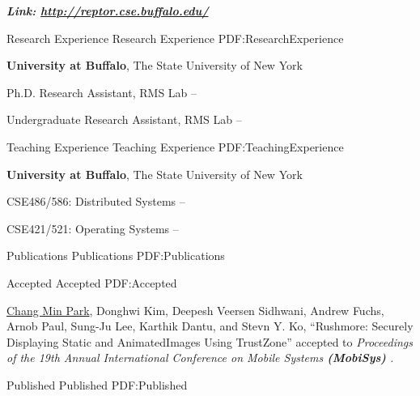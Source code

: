 \documentclass[letterpaper,MMMyyyy,nonstopmode]{simpleresumecv}
\begin{document}
\begin{Body}
\hspace{2ex}
\textbf{\textit{Link: \href{http://reptor.cse.buffalo.edu/}{http://reptor.cse.buffalo.edu/}}}
\hfill




\Section
{Research Experience}
{Research Experience}
{PDF:ResearchExperience}

\Entry
\textbf{University at Buffalo}, The State University of New York

\Gap
\BulletItem
Ph.D. Research Assistant, RMS Lab
\hfill
{} --

\Gap
\BulletItem
Undergraduate Research Assistant, RMS Lab
\hfill
{} --


\vspace{-1ex}
\Section
{Teaching Experience}
{Teaching Experience}
{PDF:TeachingExperience}

\Entry
\textbf{University at Buffalo}, The State University of New York

\Gap
\BulletItem
CSE486/586: Distributed Systems
\hfill
{} --

\Gap
\BulletItem
CSE421/521: Operating Systems
\hfill
{} --



\vspace{-0ex}
\Section
{Publications}
{Publications}
{PDF:Publications}


\SubSection
{Accepted}
{Accepted}
{PDF:Accepted}

\begingroup
\renewcommand{\MaxNumberedItem}{[88]}

\Gap
\NumberedItem{[1]}
\underline{Chang Min Park}, Donghwi Kim, Deepesh Veersen Sidhwani, Andrew Fuchs, Arnob Paul,
Sung-Ju Lee, Karthik Dantu, and Stevn Y. Ko,
``Rushmore: Securely Displaying Static and AnimatedImages Using TrustZone'' accepted to
\textit{Proceedings of the 19th Annual International Conference on Mobile Systems \textbf{(MobiSys)}
.}

\vspace{1ex}
\SubSection
{Published}
{Published}
{PDF:Published}


\end{Body}
\end{document}
